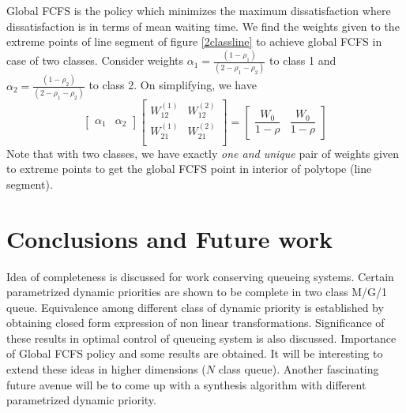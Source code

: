 \documentclass[a4paper,12pt]{article}
\begin{document}
Global FCFS is the policy which minimizes the maximum dissatisfaction where dissatisfaction is in terms of mean waiting time. We find the weights given to the extreme points of line segment of figure \ref{2classline} to achieve global FCFS in case of two classes. Consider weights $\alpha_1 = \frac{(1-\rho_1)}{(2-\rho_1 -\rho_2)}$ to class 1 and $\alpha_2 = \frac{(1-\rho_2)}{(2-\rho_1 -\rho_2)}$ to class 2. On simplifying, we have 
\begin{equation}
\begin{bmatrix}
\alpha_1 & \alpha_2
\end{bmatrix} \begin{bmatrix}
       W_{12}^{(1)} & W_{12}^{(2)}  \\
       W_{21}^{(1)} &  W_{21}^{(2)} \\
      
     \end{bmatrix} = \begin{bmatrix}
     \dfrac{W_0}{1-\rho}    & \dfrac{W_0}{1-\rho}   
        \end{bmatrix} 
\end{equation}
 Note that with two classes, we have exactly \textit{one and unique} pair of weights given to extreme points to get the global FCFS point in interior of polytope (line segment).
\section{Conclusions and Future work}
Idea of completeness is discussed for work conserving queueing systems. Certain parametrized dynamic priorities are shown to be complete in two class M/G/1 queue. Equivalence among different class of dynamic priority is established by obtaining closed form expression of non linear transformations. Significance of these results in optimal control of queueing system is also discussed. Importance of Global FCFS policy  and some results are obtained. It will be interesting to extend these ideas in higher dimensions ($N$ class queue). Another fascinating future avenue will be to come up with a synthesis algorithm with different parametrized dynamic priority.   %
\label{sec:conclusion}
\end{document}
